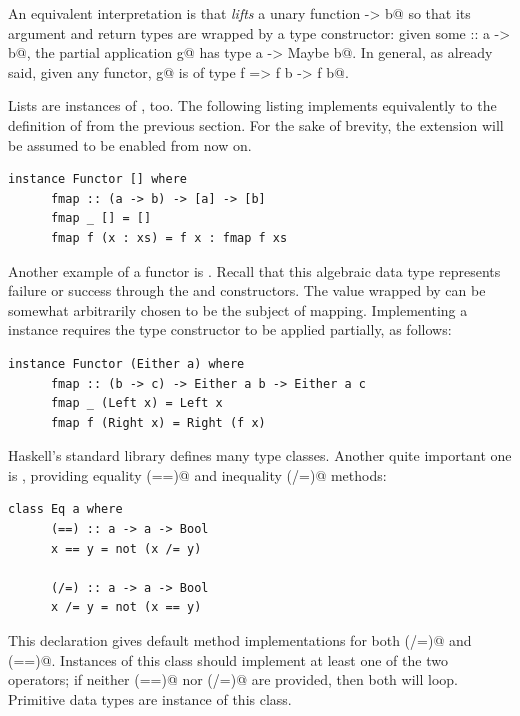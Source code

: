 \documentclass[UdineBachThesis,american,11pt]{PhdThesis}
\begin{document}
  An equivalent interpretation is that \lstinline@fmap@ \emph{lifts} a unary
  function \lstinline@a -> b@ so that its argument and return types are wrapped
  by a \lstinline@Maybe@ type constructor: given some \lstinline@g :: a -> b@,
  the partial application \lstinline@fmap g@ has type
  \lstinline@Maybe a -> Maybe b@. In general, as already said, given any
  functor, \lstinline@fmap g@ is of type \lstinline@Functor f => f b -> f b@.

  Lists are instances of \lstinline@Functor@, too. The following listing
  implements \lstinline@fmap@ equivalently to the definition of \lstinline@map@
  from the previous section. For the sake of brevity, the
  \lstinline@InstanceSigs@ extension will be assumed to be enabled from now on.

  \begin{lstlisting}[gobble=4,basicstyle=\ttfamily\small]
    instance Functor [] where
      fmap :: (a -> b) -> [a] -> [b]
      fmap _ [] = []
      fmap f (x : xs) = f x : fmap f xs
  \end{lstlisting}

  Another example of a functor is \lstinline@Either@. Recall that this algebraic
  data type represents failure or success through the \lstinline@Left@ and
  \lstinline@Right@ constructors. The value wrapped by \lstinline@Right@ can be
  somewhat arbitrarily chosen to be the subject of mapping. Implementing a
  \lstinline@Functor@ instance requires the type constructor \lstinline@Either@
  to be applied partially, as follows:

  \begin{lstlisting}[gobble=4,basicstyle=\ttfamily\small]
    instance Functor (Either a) where
      fmap :: (b -> c) -> Either a b -> Either a c
      fmap _ (Left x) = Left x
      fmap f (Right x) = Right (f x)
  \end{lstlisting}

  Haskell's standard library defines many type classes. Another quite important
  one is \lstinline@Eq@, providing equality \lstinline@(==)@ and inequality
  \lstinline@(/=)@ methods:

  \begin{lstlisting}[gobble=4,basicstyle=\ttfamily\small]
    class Eq a where
      (==) :: a -> a -> Bool
      x == y = not (x /= y)

      (/=) :: a -> a -> Bool
      x /= y = not (x == y)
  \end{lstlisting}

  This declaration gives default method implementations for both
  \lstinline@(/=)@ and \lstinline@(==)@. Instances of this class should
  implement at least one of the two operators; if neither \lstinline@(==)@ nor
  \lstinline@(/=)@ are provided, then both will loop. Primitive data types are
  instance of this class.
\end{document}
